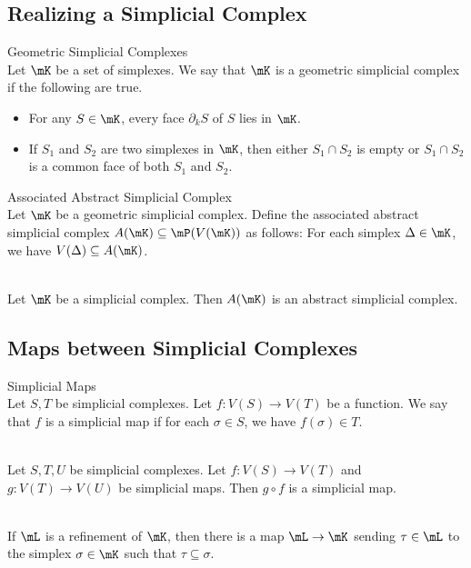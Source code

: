 \documentclass[a4paper]{article}
\begin{document}
\subsection{Realizing a Simplicial Complex}
\begin{defn}{Geometric Simplicial Complexes}{}\\
Let $\mK$ be a set of simplexes. We say that $\mK$ is a geometric simplicial complex if the following are true. 
\begin{itemize}
\item For any $S\in\mK$, every face $\partial_k S$ of $S$ lies in $\mK$. 
\item If $S_1$ and $S_2$ are two simplexes in $\mK$, then either $S_1\cap S_2$ is empty or $S_1\cap S_2$ is a common face of both $S_1$ and $S_2$. 
\end{itemize}
\end{defn}

\begin{defn}{Associated Abstract Simplicial Complex}{}\\
Let $\mK$ be a geometric simplicial complex. Define the associated abstract simplicial complex $A(\mK)\subseteq\mP(V(\mK))$ as follows: For each simplex $\Delta\in\mK$, we have $V(\Delta)\subseteq A(\mK)$. 
\end{defn}

\begin{lmm}{}{}\\
Let $\mK$ be a simplicial complex. Then $A(\mK)$ is an abstract simplicial complex. 
\end{lmm}

\subsection{Maps between Simplicial Complexes}
\begin{defn}{Simplicial Maps}{}\\
Let $S,T$ be simplicial complexes. Let $f:V(S)\to V(T)$ be a function. We say that $f$ is a simplicial map if for each $\sigma\in S$, we have $f(\sigma)\in T$. 
\end{defn}

\begin{lmm}{}{}\\
Let $S,T,U$ be simplicial complexes. Let $f:V(S)\to V(T)$ and $g:V(T)\to V(U)$ be simplicial maps. Then $g\circ f$ is a simplicial map. 
\end{lmm}

\begin{eg}{}{}\\
If $\mL$ is a refinement of $\mK$, then there is a map $\mL\to\mK$ sending $\tau\in\mL$ to the simplex $\sigma\in\mK$ such that $\tau\subseteq\sigma$. 
\end{eg}
\end{document}
